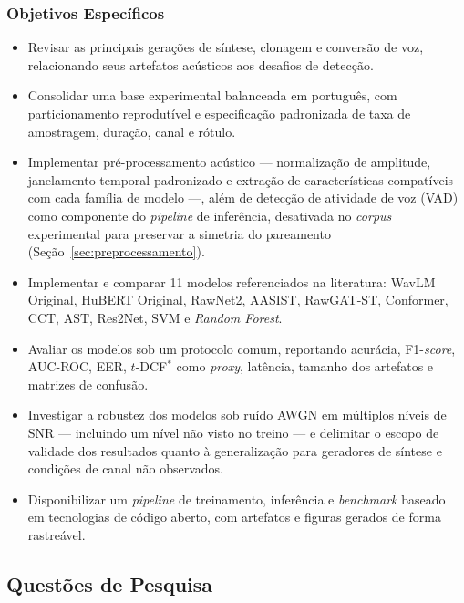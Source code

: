 \documentclass[12pt,a4paper]{article}
\begin{document}
\subsubsection{Objetivos Específicos}
\begin{itemize}
	\item Revisar as principais gerações de síntese, clonagem e conversão de
	voz, relacionando seus artefatos acústicos aos desafios de detecção.
	\item Consolidar uma base experimental balanceada em português, com
	particionamento reprodutível e especificação padronizada de taxa de
	amostragem, duração, canal e rótulo.
	\item Implementar pré-processamento acústico --- normalização de amplitude,
	janelamento temporal padronizado e extração de características compatíveis
	com cada família de modelo ---, além de detecção de atividade de voz (VAD)
	como componente do \textit{pipeline} de inferência, desativada no
	\textit{corpus} experimental para preservar a simetria do pareamento
	(Seção~\ref{sec:preprocessamento}).
	\item Implementar e comparar \num{11} modelos referenciados na literatura:
	WavLM Original, HuBERT Original, RawNet2, AASIST, RawGAT-ST, Conformer,
	CCT, AST, Res2Net, SVM e \textit{Random Forest}.
	\item Avaliar os modelos sob um protocolo comum, reportando acurácia,
	F1-\textit{score}, AUC-ROC, EER, $t$-DCF$^\ast$ como \textit{proxy}, latência, tamanho dos artefatos
	e matrizes de confusão.
	\item Investigar a robustez dos modelos sob ruído AWGN em múltiplos níveis
	de SNR --- incluindo um nível não visto no treino --- e delimitar o escopo
	de validade dos resultados quanto à generalização para geradores de síntese
	e condições de canal não observados.
	\item Disponibilizar um \textit{pipeline} de treinamento, inferência e
	\textit{benchmark} baseado em tecnologias de código aberto, com artefatos e
	figuras gerados de forma rastreável.
\end{itemize}

\subsection{Questões de Pesquisa}
\label{sec:questoes_pesquisa}
\end{document}
